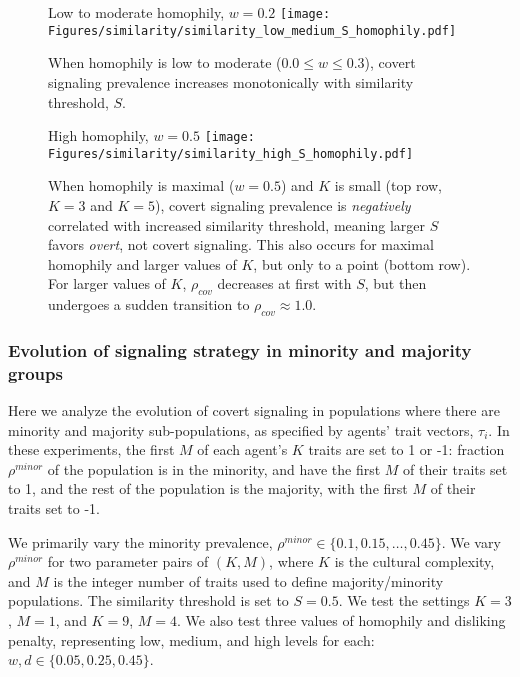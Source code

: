 \documentclass[11pt,letterpaper]{article}
\begin{document}
\begin{figure}
  \centering
  \large{Low to moderate homophily, $w=0.2$}
  \texttt{[image: Figures/similarity/similarity\_low\_medium\_S\_homophily.pdf]}
  \caption{When homophily is low to moderate ($0.0 \leq w \leq 0.3$), covert signaling
  prevalence increases monotonically with similarity threshold, $S$.}
  \label{fig:covertAndSimilarity}
\end{figure}

\begin{figure}
  \centering
  \large{High homophily, $w=0.5$}
  \texttt{[image: Figures/similarity/similarity\_high\_S\_homophily.pdf]}
  \caption{
      When homophily is maximal ($w=0.5$) and $K$ is small (top row,
      $K=3$ and $K=5$), covert signaling
      prevalence is \emph{negatively} correlated with increased similarity 
      threshold, meaning larger $S$ favors \emph{overt}, not covert signaling. 
      This also occurs for maximal homophily and larger values of $K$, but 
      only to a point (bottom row). For larger values of $K$, $\rho_{cov}$
      decreases at first with $S$, but then undergoes a sudden transition to
      $\rho_{cov} \approx 1.0$.
  }
  \label{fig:overtAndSimilarity}
\end{figure}




\subsubsection{Evolution of signaling strategy in minority and majority groups}

Here we analyze the evolution of covert signaling in populations where there
are minority and majority sub-populations, as specified by agents' trait
vectors, $\tau_i$. In these experiments, the first $M$ of each agent's $K$ traits
are set to 1 or -1: fraction $\rho^{minor}$ of the
population is in the minority, and have the first $M$ of their traits set to
1, and the rest of the population is the majority, with the first $M$ of their
traits set to -1. 

We primarily vary the minority prevalence, $\rho^{minor} \in \{0.1, 0.15, \ldots, 0.45\}$. 
We vary $\rho^{minor}$ for two parameter pairs of $(K, M)$, where $K$ is the cultural 
complexity, and $M$ is the integer number of traits used to define 
majority/minority populations. The similarity threshold is set to $S=0.5$. 
We test the settings $K=3$, $M=1$, and $K=9$, $M=4$. We also test three
values of homophily and disliking penalty, representing low, medium, and high
levels for each: $w,d \in \{0.05, 0.25, 0.45\}$.
\end{document}
